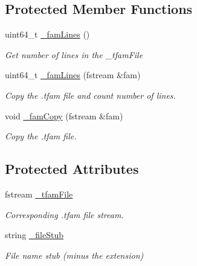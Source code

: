 \subsection*{Protected Member Functions}
\begin{DoxyCompactItemize}
\item 
uint64\+\_\+t \hyperlink{classvarfiles_1_1_tped_file_af980d8b7900488c642980a5e59b5a379}{\+\_\+fam\+Lines} ()
\begin{DoxyCompactList}\small\item\em Get number of lines in the {\ttfamily \+\_\+tfam\+File} \end{DoxyCompactList}\item 
uint64\+\_\+t \hyperlink{classvarfiles_1_1_tped_file_a871c29be16893541ed02d8518808a301}{\+\_\+fam\+Lines} (fstream \&fam)
\begin{DoxyCompactList}\small\item\em Copy the .tfam file and count number of lines. \end{DoxyCompactList}\item 
void \hyperlink{classvarfiles_1_1_tped_file_ae0151eb62fa59641ba375ada61458e7c}{\+\_\+fam\+Copy} (fstream \&fam)
\begin{DoxyCompactList}\small\item\em Copy the .tfam file. \end{DoxyCompactList}\end{DoxyCompactItemize}
\subsection*{Protected Attributes}
\begin{DoxyCompactItemize}
\item 
\mbox{\label{classvarfiles_1_1_tped_file_aa2d0f0d04aa2f63efa7dcd3f83bf89c5}} 
fstream \hyperlink{classvarfiles_1_1_tped_file_aa2d0f0d04aa2f63efa7dcd3f83bf89c5}{\+\_\+tfam\+File}
\begin{DoxyCompactList}\small\item\em Corresponding .tfam file stream. \end{DoxyCompactList}\item 
\mbox{\label{classvarfiles_1_1_tped_file_a10b088a91d8c8620c7c6d5405ca05477}} 
string \hyperlink{classvarfiles_1_1_tped_file_a10b088a91d8c8620c7c6d5405ca05477}{\+\_\+file\+Stub}
\begin{DoxyCompactList}\small\item\em File name stub (minus the extension) \end{DoxyCompactList}\end{DoxyCompactItemize}


